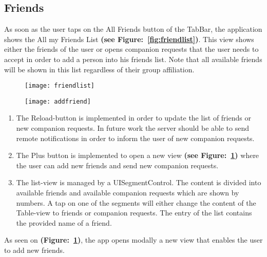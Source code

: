 \subsection{Friends}

As soon as the user taps on the All Friends button of the TabBar, the application shows the All my Friends List \textbf{(see Figure:~\ref{fig:friendlist})}. This view shows either the friends of the user or opens companion requests that the user needs to accept in order to add a person into his friends list. Note that all available friends will be shown in this list regardless of their group affiliation.

\begin{figure}
\centering
\begin{minipage}{.5\textwidth}
  \centering
  \texttt{[image: friendlist]}
  \label{fig:friendlist}
\end{minipage}%
\begin{minipage}{.5\textwidth}
  \centering
  \texttt{[image: addfriend]}
  \label{fig:addfriend}
\end{minipage}
\end{figure}

\begin{enumerate}
\item The Reload-button is implemented in order to update the list of friends or new companion requests. In future work the server should be able to send remote notifications in order to inform the user of new companion requests.

\item The Plus button is implemented to open a new view \textbf{(see Figure:~\ref{fig:addfriend})} where the user can add new friends and send new companion requests.

\item The list-view is managed by a UISegmentControl. The content is divided into available friends and available companion requests which are shown by numbers. A tap on one of the segments will either change the content of the Table-view to friends or companion requests. The entry of the list contains the provided name of a friend.
\end{enumerate}


As seen on \textbf{(Figure:~\ref{fig:addfriend})}, the app opens modally a new view that enables the user to add new friends.

